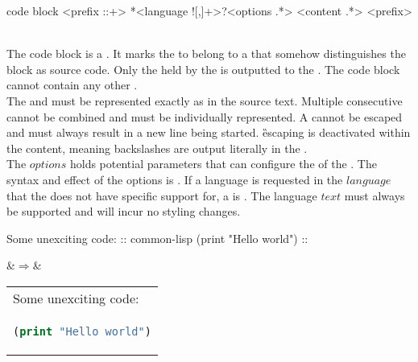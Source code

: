 \begin{identifier}{code block}
<prefix ::+> *<language ![,]+>?<options .*>
<content .*>
<prefix>
\end{identifier}
 \\

The code block is a . It marks the  to belong to a  that somehow distinguishes the block as source code. Only the  held by the  is outputted to the . The code block  cannot contain any other . \\

The  and  must be represented exactly as in the source text. Multiple consecutive   cannot be combined and must be individually represented. A   cannot be escaped and must always result in a new line being started. \G{escaping} is deactivated within the content, meaning backslashes are output literally in the .  \\

The \inline$options$  holds potential parameters that can configure the  of the . The syntax and effect of the options is . If a language is requested in the \linline$language$  that the  does not have specific support for, a  is . The language \inline$text$ must always be supported and will incur no styling changes. \\

\begin{examples}
\begin{examplesource}
Some unexciting code:
:: common-lisp
(print "Hello world")
::
\end{examplesource}
  &$\Rightarrow$&
  \begin{tabular}{@{}l@{}}
Some unexciting code: \\
\begin{lstlisting}[style=codestyle,language=Lisp,showstringspaces=false]
(print "Hello world")
\end{lstlisting}
\end{tabular}
\end{examples}

